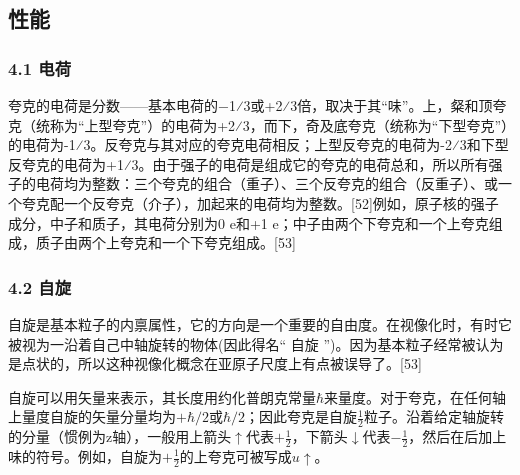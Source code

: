 \subsection{性能}
\subsubsection{4.1 电荷}
夸克的电荷是分数——基本电荷的−1⁄3或+2⁄3倍，取决于其“味”。上，粲和顶夸克（统称为“上型夸克”）的电荷为+2⁄3，而下，奇及底夸克（统称为“下型夸克”）的电荷为-1⁄3。反夸克与其对应的夸克电荷相反；上型反夸克的电荷为-2⁄3和下型反夸克的电荷为+1⁄3。由于强子的电荷是组成它的夸克的电荷总和，所以所有强子的电荷均为整数：三个夸克的组合（重子）、三个反夸克的组合（反重子）、或一个夸克配一个反夸克（介子），加起来的电荷均为整数。[52]例如，原子核的强子成分，中子和质子，其电荷分别为0 e和+1 e；中子由两个下夸克和一个上夸克组成，质子由两个上夸克和一个下夸克组成。[53]

\subsubsection{4.2 自旋}
自旋是基本粒子的内禀属性，它的方向是一个重要的自由度。在视像化时，有时它被视为一沿着自己中轴旋转的物体(因此得名“ 自旋 ”)。因为基本粒子经常被认为是点状的，所以这种视像化概念在亚原子尺度上有点被误导了。[53]

自旋可以用矢量来表示，其长度用约化普朗克常量$\hbar$来量度。对于夸克，在任何轴上量度自旋的矢量分量均为$+\hbar/2$或$\hbar/2$；因此夸克是自旋$\frac{1}{2}$粒子。沿着给定轴旋转的分量（惯例为z轴），一般用上箭头$\uparrow$代表$+\frac{1}{2}$，下箭头$\downarrow$代表$-\frac{1}{2}$，然后在后加上味的符号。例如，自旋为$+\frac{1}{2}$的上夸克可被写成$u\uparrow$。


